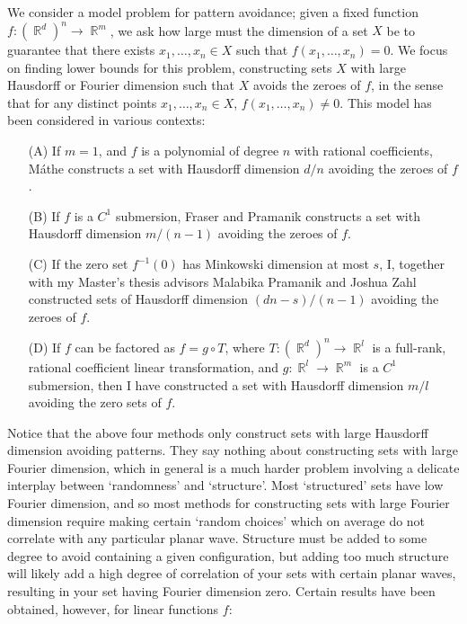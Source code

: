 \documentclass[11pt]{article}
\DeclareMathOperator{\RR}{\mathbb{R}}
\begin{document}
We consider a model problem for pattern avoidance; given a fixed function $f: (\RR^d)^n \to \RR^m$, we ask how large must the dimension of a set $X$ be to guarantee that there exists $x_1,\dots,x_n \in X$ such that $f(x_1,\dots,x_n) = 0$. We focus on finding lower bounds for this problem, constructing sets $X$ with large Hausdorff or Fourier dimension such that $X$ avoids the zeroes of $f$, in the sense that for any distinct points $x_1,\dots,x_n \in X$, $f(x_1,\dots,x_n) \neq 0$. This model has been considered in various contexts:
%
\begin{itemize}
	\item[(A)] If $m = 1$, and $f$ is a polynomial of degree $n$ with rational coefficients, M\'{a}the \cite{Mathe} constructs a set with Hausdorff dimension $d/n$ avoiding the zeroes of $f$.

	\item[(B)] If $f$ is a $C^1$ submersion, Fraser and Pramanik \cite{FraserPramanik} constructs a set with Hausdorff dimension $m/(n-1)$ avoiding the zeroes of $f$. 

	\item[(C)] If the zero set $f^{-1}(0)$ has Minkowski dimension at most $s$, I, together with my Master's thesis advisors Malabika Pramanik and Joshua Zahl \cite{DensonPramanikZahl} constructed sets of Hausdorff dimension $(dn - s)/(n-1)$ avoiding the zeroes of $f$.

	\item[(D)] If $f$ can be factored as $f = g \circ T$, where $T: (\RR^d)^n \to \RR^l$ is a full-rank, rational coefficient linear transformation, and $g: \RR^l \to \RR^m$ is a $C^1$ submersion, then I \cite{DensonCharacterization} have constructed a set with Hausdorff dimension $m/l$ avoiding the zero sets of $f$.
\end{itemize}
%
Notice that the above four methods only construct sets with large Hausdorff dimension avoiding patterns. They say nothing about constructing sets with large Fourier dimension, which in general is a much harder problem involving a delicate interplay between `randomness' and `structure'. Most `structured' sets have low Fourier dimension, %
 and so most methods for constructing sets with large Fourier dimension require making certain `random choices' which on average do not correlate with any particular planar wave. Structure must be added to some degree to avoid containing a given configuration, but adding too much structure will likely add a high degree of correlation of your sets with certain planar waves, resulting in your set having Fourier dimension zero. Certain results have been obtained, however, for linear functions $f$:
\end{document}
